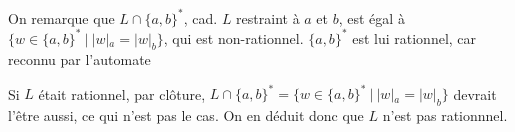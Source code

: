 \begin{correction*}
On remarque que $L \cap \{a,b\}^*$, cad. $L$ restraint à $a$ et $b$, est égal à $\{w \in \{a,b\}^* ~|~ |w|_a = |w|_b\}$, qui est non-rationnel. $\{a,b\}^*$ est lui rationnel, car reconnu par l'automate 



\begin{figure}[H]
\centering
{}
\end{figure}


Si $L$ était rationnel, par clôture, $L \cap \{a,b\}^* = \{w \in \{a,b\}^* ~|~ |w|_a = |w|_b\}$ devrait l'être aussi, ce qui n'est pas le cas. On en déduit donc que $L$ n'est pas rationnnel.

\end{correction*}
